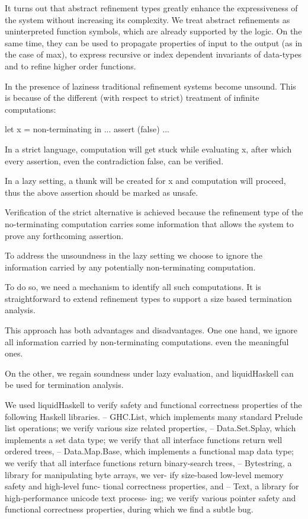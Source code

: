 \documentclass[10pt,a4paper]{article}
\begin{document}
It turns out that abstract refinement types greatly enhance the expressiveness of the system
without increasing its complexity.
We treat abstract refinements as uninterpreted function symbols, which are already supported 
by the logic. On the same time, they can be used to propagate properties of input to the output (as in the case of max),
to express recursive or index dependent invariants of data-types and to refine higher order functions.

In the presence of laziness traditional refinement systems become unsound.
This is because of the different (with respect to strict) treatment of infinite computations:

let x = non-terminating
in     ... assert (false) ...

In a strict language, computation will get stuck while evaluating x, 
after which every assertion, even the contradiction false, can be verified.

In a lazy setting, a thunk will be created for x and computation will proceed, 
thus the above assertion should be marked as unsafe.

Verification of the strict alternative is achieved because the refinement type of the
no-terminating computation carries some information that allows the system to prove any 
forthcoming assertion.

To address the unsoundness in the lazy setting we choose to ignore the information carried 
by any potentially non-terminating computation.

To do so, we need a mechanism to identify all such computations.
It is straightforward to extend refinement types to support a size based termination analysis.

This approach has both advantages and disadvantages.
One one hand, we ignore all information carried by non-terminating computations.
even the meaningful ones.

On the other, we regain soundness under lazy evaluation, and 
liquidHaskell can be used for termination analysis.

We used liquidHaskell to verify safety and functional correctness properties of the following Haskell libraries.
-- GHC.List, which implements many standard Prelude list
operations; we verify various size related properties,
-- Data.Set.Splay, which implements a set data type; 
we verify that all interface functions return well ordered trees,
-- Data.Map.Base, which implements a functional map data
type; we verify that all interface functions return
binary-search trees,
-- Bytestring, a library for manipulating byte arrays, we ver-
ify size-based low-level memory safety and high-level func-
tional correctness properties, and
-- Text, a library for high-performance unicode text process-
ing; we verify various pointer safety and functional correctness
properties, during which we find a subtle bug.
\end{document}
